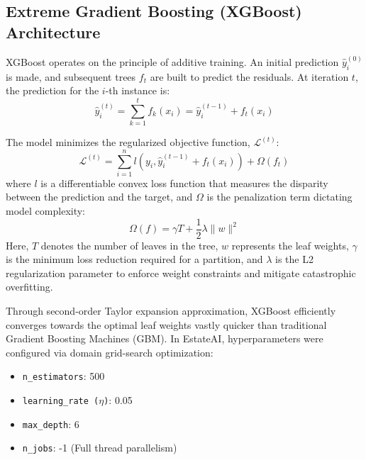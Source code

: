 \documentclass[conference]{IEEEtran}
\begin{document}
\subsection{Extreme Gradient Boosting (XGBoost) Architecture}
XGBoost operates on the principle of additive training. An initial prediction $\hat{y}_i^{(0)}$ is made, and subsequent trees $f_t$ are built to predict the residuals. At iteration $t$, the prediction for the $i$-th instance is:
\begin{equation}
\hat{y}_i^{(t)} = \sum_{k=1}^t f_k(x_i) = \hat{y}_i^{(t-1)} + f_t(x_i)
\end{equation}

The model minimizes the regularized objective function, $\mathcal{L}^{(t)}$:
\begin{equation}
\mathcal{L}^{(t)} = \sum_{i=1}^n l(y_i, \hat{y}_i^{(t-1)} + f_t(x_i)) + \Omega(f_t)
\end{equation}
where $l$ is a differentiable convex loss function that measures the disparity between the prediction and the target, and $\Omega$ is the penalization term dictating model complexity:
\begin{equation}
\Omega(f) = \gamma T + \frac{1}{2}\lambda \|w\|^2
\end{equation}
Here, $T$ denotes the number of leaves in the tree, $w$ represents the leaf weights, $\gamma$ is the minimum loss reduction required for a partition, and $\lambda$ is the L2 regularization parameter to enforce weight constraints and mitigate catastrophic overfitting.

Through second-order Taylor expansion approximation, XGBoost efficiently converges towards the optimal leaf weights vastly quicker than traditional Gradient Boosting Machines (GBM). In EstateAI, hyperparameters were configured via domain grid-search optimization:
\begin{itemize}
    \item \texttt{n\_estimators}: 500
    \item \texttt{learning\_rate ($\eta$)}: 0.05
    \item \texttt{max\_depth}: 6
    \item \texttt{n\_jobs}: -1 (Full thread parallelism)
\end{itemize}
\end{document}
